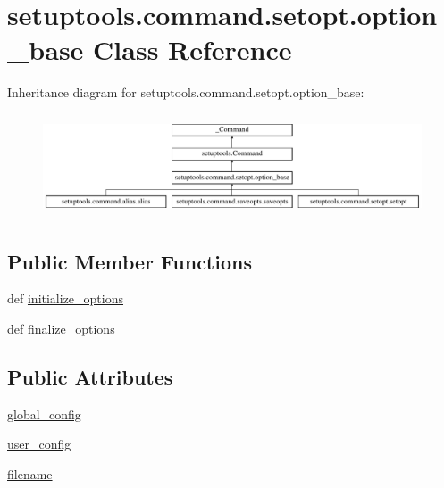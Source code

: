 \hypertarget{classsetuptools_1_1command_1_1setopt_1_1option__base}{}\section{setuptools.\+command.\+setopt.\+option\+\_\+base Class Reference}
\label{classsetuptools_1_1command_1_1setopt_1_1option__base}
Inheritance diagram for setuptools.\+command.\+setopt.\+option\+\_\+base\+:\begin{figure}[H]
\begin{center}
\leavevmode
\includegraphics[height=3.085400cm]{classsetuptools_1_1command_1_1setopt_1_1option__base}
\end{center}
\end{figure}
\subsection*{Public Member Functions}
\begin{DoxyCompactItemize}
\item 
def \hyperlink{classsetuptools_1_1command_1_1setopt_1_1option__base_a302cb66a5181008600ae5c271d69c55e}{initialize\+\_\+options}
\item 
def \hyperlink{classsetuptools_1_1command_1_1setopt_1_1option__base_a5c90698877484c0a66065c22046af21a}{finalize\+\_\+options}
\end{DoxyCompactItemize}
\subsection*{Public Attributes}
\begin{DoxyCompactItemize}
\item 
\hyperlink{classsetuptools_1_1command_1_1setopt_1_1option__base_a84a54e15422a6d7d41046ea769a7b061}{global\+\_\+config}
\item 
\hyperlink{classsetuptools_1_1command_1_1setopt_1_1option__base_abf3e8d8871be902ab84f02921b83b0e1}{user\+\_\+config}
\item 
\hyperlink{classsetuptools_1_1command_1_1setopt_1_1option__base_aa51e1c6a8c29785f328ecc8abafb7895}{filename}
\end{DoxyCompactItemize}
